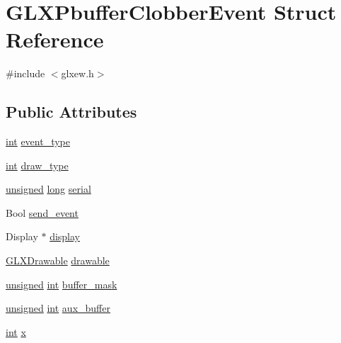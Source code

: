 \hypertarget{struct_g_l_x_pbuffer_clobber_event}{\section{G\-L\-X\-Pbuffer\-Clobber\-Event Struct Reference}
\label{struct_g_l_x_pbuffer_clobber_event}
}


{\ttfamily \#include $<$glxew.\-h$>$}

\subsection*{Public Attributes}
\begin{DoxyCompactItemize}
\item 
\hyperlink{wglew_8h_a500a82aecba06f4550f6849b8099ca21}{int} \hyperlink{struct_g_l_x_pbuffer_clobber_event_a30d7162d8d77246b01f5e610cda4da68}{event\-\_\-type}
\item 
\hyperlink{wglew_8h_a500a82aecba06f4550f6849b8099ca21}{int} \hyperlink{struct_g_l_x_pbuffer_clobber_event_a243f92b79d3cfbde73eab02815be2320}{draw\-\_\-type}
\item 
\hyperlink{_free_image_8h_a425076c7067a1b5166e2cc530e914814}{unsigned} \hyperlink{_free_image_8h_a7701bb16365a51acda9234120673781d}{long} \hyperlink{struct_g_l_x_pbuffer_clobber_event_a6390b2875ae06a4cb827d2b4c321eda3}{serial}
\item 
Bool \hyperlink{struct_g_l_x_pbuffer_clobber_event_aa51969e67e4ad6095bda26ca64fe8ba6}{send\-\_\-event}
\item 
Display $\ast$ \hyperlink{struct_g_l_x_pbuffer_clobber_event_aeb49bb93cc59448e75d66170a39596d1}{display}
\item 
\hyperlink{glxew_8h_a826f51745d9d6c81bdbac47ae2b80cf7}{G\-L\-X\-Drawable} \hyperlink{struct_g_l_x_pbuffer_clobber_event_a388908b766e35205c1a461ea8b60439f}{drawable}
\item 
\hyperlink{_free_image_8h_a425076c7067a1b5166e2cc530e914814}{unsigned} \hyperlink{wglew_8h_a500a82aecba06f4550f6849b8099ca21}{int} \hyperlink{struct_g_l_x_pbuffer_clobber_event_aff4c23d00f6dad98427f8d32a5f10580}{buffer\-\_\-mask}
\item 
\hyperlink{_free_image_8h_a425076c7067a1b5166e2cc530e914814}{unsigned} \hyperlink{wglew_8h_a500a82aecba06f4550f6849b8099ca21}{int} \hyperlink{struct_g_l_x_pbuffer_clobber_event_a13193b6e7e3e52b15f754fe91403b7ec}{aux\-\_\-buffer}
\item 
\hyperlink{wglew_8h_a500a82aecba06f4550f6849b8099ca21}{int} \hyperlink{struct_g_l_x_pbuffer_clobber_event_a8f0a7162a033c89ee94ce535580dbc32}{x}

\end{DoxyCompactItemize}
